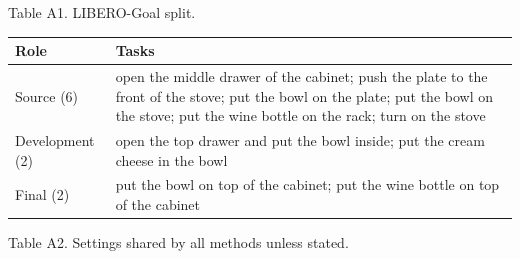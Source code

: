 \documentclass[11pt,a4paper]{article}
\begin{document}
Table A1. LIBERO-Goal split.

{\def\LTcaptype{none} %
{\small
\begin{longtable}[]{@{}
  >{\raggedright\arraybackslash}p{}
  >{\raggedright\arraybackslash}p{}@{}}
\toprule\noalign{}
\begin{minipage}[b]{\linewidth}\raggedright
Role
\end{minipage} & \begin{minipage}[b]{\linewidth}\raggedright
Tasks
\end{minipage} \\
\midrule\noalign{}
\endhead
\bottomrule\noalign{}
\endlastfoot
Source (6) & open the middle drawer of the cabinet; push the plate to the front of the stove; put the bowl on the plate; put the bowl on the stove; put the wine bottle on the rack; turn on the stove \\
Development (2) & open the top drawer and put the bowl inside; put the cream cheese in the bowl \\
Final (2) & put the bowl on top of the cabinet; put the wine bottle on top of the cabinet \\
\end{longtable}
}
}

Table A2. Settings shared by all methods unless stated.
\end{document}
